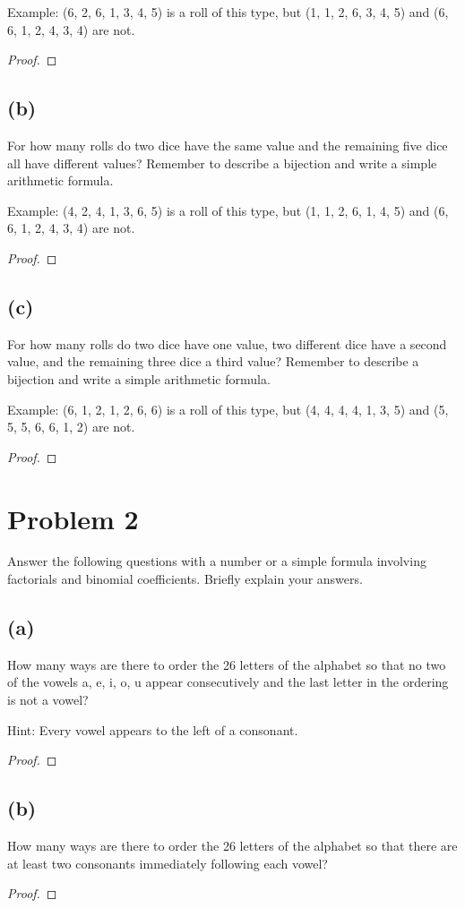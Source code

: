 \documentclass[14pt]{extarticle}
\begin{document}
Example: (6, 2, 6, 1, 3, 4, 5) is a roll of this type, but (1, 1, 2, 6, 3, 4, 5) and (6, 6, 1, 2, 4, 3, 4) are not.
\begin{proof}
\end{proof}
\subsection{(b)}
For how many rolls do two dice have the same value and the remaining five dice all have different values? Remember to describe a bijection and write a simple arithmetic formula.

Example: (4, 2, 4, 1, 3, 6, 5) is a roll of this type, but (1, 1, 2, 6, 1, 4, 5) and (6, 6, 1, 2, 4, 3, 4) are not.
\begin{proof}
\end{proof}
\subsection{(c)}
For how many rolls do two dice have one value, two different dice have a second value, and the remaining three dice a third value? Remember to describe a bijection and write a simple arithmetic formula.

Example: (6, 1, 2, 1, 2, 6, 6) is a roll of this type, but (4, 4, 4, 4, 1, 3, 5) and (5, 5, 5, 6, 6, 1, 2) are not.
\begin{proof}
\end{proof}

\section{Problem 2}
Answer the following questions with a number or a simple formula involving factorials and binomial coefficients. Briefly explain your answers.
\subsection{(a)}
How many ways are there to order the 26 letters of the alphabet so that no two of the vowels a, e, i, o, u appear consecutively and the last letter in the ordering is not a vowel?

Hint: Every vowel appears to the left of a consonant.
\begin{proof}
\end{proof}
\subsection{(b)}
How many ways are there to order the 26 letters of the alphabet so that there are at least two consonants immediately following each vowel?
\begin{proof}
\end{proof}
\end{document}
